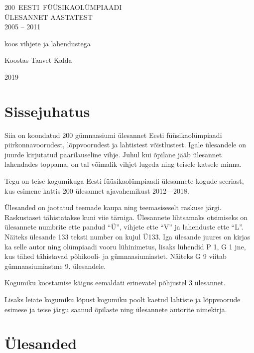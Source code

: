 \documentclass[11pt]{article}
\begin{document}
\begin{titlepage}
	\centering
	\vspace{10cm}
	{\sffamily\Huge \mbox{200 EESTI FÜÜSIKAOLÜMPIAADI}\\ ÜLESANNET AASTATEST\\ 2005 -- 2011\par}
	\vspace{1cm}
	{\Large koos vihjete ja lahendustega\par}
	\vfill
	{\Large Koostas Taavet Kalda}

	\vfill

	{\large 2019}
\end{titlepage}

\tableofcontents
\newpage

{\setlength{\parindent}{24pt}
\section{Sissejuhatus}

Siia on koondatud 200 gümnaasiumi ülesannet Eesti füüsikaolümpiaadi piirkonnavoorudest, lõppvoorudest ja lahtistest võistlustest. Igale ülesandele on juurde kirjutatud paarilauseline vihje. Juhul kui õpilane jääb ülesannet lahendades toppama, on tal võimalik vihjet lugeda ning teisele katsele minna.

Tegu on teise kogumikuga Eesti füüsikaolümpiaadi ülesannete kogude seeriast, kus esimene kattis 200 ülesannet ajavahemikust 2012---2018.

Ülesanded on jaotatud teemade kaupa ning teemasiseselt raskuse järgi. Raskustaset tähistatakse kuni viie tärniga. Ülesannete lihtsamaks otsimiseks on ülesannete numbrite ette pandud \enquote{Ü}, vihjete ette \enquote{V} ja lahenduste ette \enquote{L}. Näiteks ülesande 133 teksti number on kujul Ü133. Iga ülesande juures on kirjas ka selle autor ning olümpiaadi vooru lühinimetus, lisaks lühendid P 1, G 1 jne, kus tähed tähistavad põhikooli- ja gümnaasiumiastet. Näiteks G 9 viitab gümnaasiumiastme 9. ülesandele.

Kogumiku koostamise käigus eemaldati erinevatel põhjustel 3 ülesannet.

Lisaks leiate kogumiku lõpust kogumiku poolt kaetud lahtiste ja lõppvoorude esimese ja teise järgu saanud õpilaste ning ülesannete autorite nimekirja.
\newpage
\setlength{\parindent}{0pt}

        \section{Ülesanded}
        \ToggleStatement
}
\end{document}
